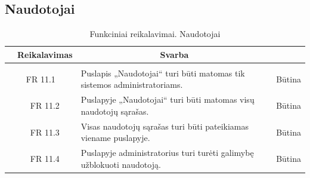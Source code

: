 \documentclass{VUMIFPSkursinis}
\begin{document}
	\subsection{Naudotojai}
	\begin{table}[H]
		\caption{Funkciniai reikalavimai. Naudotojai}
		\begin{tabular}{|p{1cm}|p{1cm}|p{}|p{}|}
			\hline 
			\rowcolor{gray!50}
			\multicolumn{2}{|c|}{{\bfseries Kodas}}&
			\multicolumn{1}{c|}{{\bfseries Reikalavimas}}&
			\multicolumn{1}{c|}{{\bfseries Svarba}}\\
			\hline
			\rowcolor{lightgray}
			\multicolumn{4}{|c|}{Naudotojai}\\				
			\hline
			\multicolumn{2}{|c|}{FR 11.1}&
			{Puslapis „Naudotojai“ turi būti matomas tik sistemos administratoriams.
			}&		
			\multicolumn{1}{c|}{Būtina}\\
			\hline
			\multicolumn{1}{|c}{}&
			\multicolumn{1}{c|}{FR 11.2}&
			{Puslapyje „Naudotojai“ turi būti matomas visų naudotojų sąrašas.
			}&		
			\multicolumn{1}{c|}{Būtina}\\
			\hline	
			\multicolumn{1}{|c}{}&
			\multicolumn{1}{c|}{FR 11.3}&
			{Visas naudotojų sąrašas turi būti pateikiamas viename puslapyje.
			}&
			\multicolumn{1}{c|}{Būtina}\\									
			\hline
			\multicolumn{1}{|c}{}&
			\multicolumn{1}{c|}{FR 11.4}&
			{Puslapyje administratorius turi turėti galimybę užblokuoti naudotoją.
			}&
			\multicolumn{1}{c|}{Būtina}\\									
			\hline
		\end{tabular}		
	\end{table}
	
\end{document}
